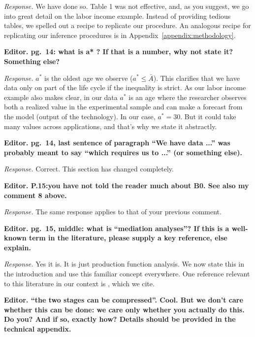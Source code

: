\noindent \textit{Response.} We have done so. Table 1 was not effective, and, as you suggest, we go into great detail on the labor income example. Instead of providing tedious tables, we spelled out a recipe to replicate our procedure. An analogous recipe for replicating our inference procedures is in Appendix~\ref{appendix:methodology}.

\noindent \textbf{Editor. pg.\ 14: what is a* ? If that is a number, why not state it? Something else?}

\noindent \textit{Response.} $a^*$ is the oldest age we observe ($a^* \leq \bar{A}$). This clarifies that we have data only on part of the life cycle if the inequality is strict. As our labor income example also makes clear, in our data $a^*$ is an age where the researcher observes both a realized value in the experimental sample and can make a forecast from the model (output of the technology). In our case, $a^* = 30$. But it could take many values across applications, and that's why we state it abstractly.

\noindent \textbf{Editor. pg.\ 14, last sentence of paragraph ``We have data ...'' was probably meant to say ``which requires us to ...'' (or something else).}

\noindent \textit{Response.} Correct. This section has changed completely.

\noindent \textbf{Editor. P.15:you have not told the reader much about B0. See also my comment 8 above.}

\noindent \textit{Response.} The same response applies to that of your previous comment.

\noindent \textbf{Editor. pg.\ 15, middle: what is ``mediation analyses''? If this is a well-known term in the literature, please supply a key reference, else explain.}

\noindent \textit{Response.} Yes it is. It is just production function analysis. We now state this in the introduction and use this familiar concept everywhere. One reference relevant to this literature in our context is \citet{Heckman_Pinto_etal_2013_PerryFactor}, which we cite.

\noindent \textbf{Editor.  ``the two stages can be compressed''. Cool. But we don't care whether this can be done: we care only whether you actually do this. Do you? And if so, exactly how? Details should be provided in the technical appendix.}

